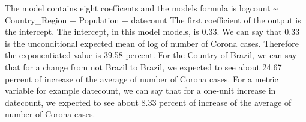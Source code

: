 \documentclass[]{article}
\begin{document}
The model contains eight coefficents and the models formula is logcount
\textasciitilde{} Country\_Region + Population + datecount The first
coefficient of the output is the intercept. The intercept, in this model
models, is 0.33. We can say that 0.33 is the unconditional expected mean
of log of number of Corona cases. Therefore the exponentiated value is
39.58 percent. For the Country of Brazil, we can say that for a change
from not Brazil to Brazil, we expected to see about 24.67 percent of
increase of the average of number of Corona cases. For a metric variable
for example datecount, we can say that for a one-unit increase in
datecount, we expected to see about 8.33 percent of increase of the
average of number of Corona cases.
\end{document}
